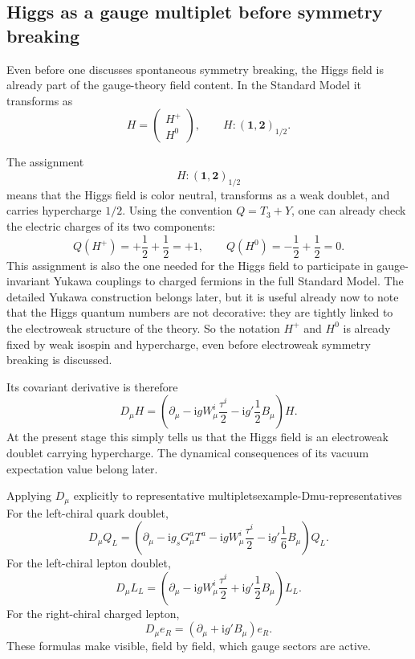 \documentclass[11pt,a4paper]{article}
\newcommand{\ii}{\mathrm{i}}
\newcommand{\p}{\partial}
\begin{document}
\subsection{Higgs as a gauge multiplet before symmetry breaking}

Even before one discusses spontaneous symmetry breaking, the Higgs field is already part of the gauge-theory field content. In the Standard Model it transforms as
\begin{equation}
H=\begin{pmatrix}H^+\\ H^0\end{pmatrix},
\qquad
H:(\mathbf{1},\mathbf{2})_{1/2}.
\label{eq:Higgs-representation-expanded}
\end{equation}

The assignment
\[
H:(\mathbf{1},\mathbf{2})_{1/2}
\]
means that the Higgs field is color neutral, transforms as a weak doublet, and carries hypercharge \(1/2\). Using the convention \(Q=T_3+Y\), one can already check the electric charges of its two components:
\begin{equation}
	Q(H^+) = +\frac12 + \frac12 = +1,
	\qquad
	Q(H^0) = -\frac12 + \frac12 = 0.
	\label{eq:Higgs-charge-check}
\end{equation}
This assignment is also the one needed for the Higgs field to participate in gauge-invariant Yukawa couplings to charged fermions in the full Standard Model. The detailed Yukawa construction belongs later, but it is useful already now to note that the Higgs quantum numbers are not decorative: they are tightly linked to the electroweak structure of the theory. 
So the notation \(H^+\) and \(H^0\) is already fixed by weak isospin and hypercharge, even before electroweak symmetry breaking is discussed.

Its covariant derivative is therefore
\begin{equation}
D_\mu H=
\left(
\p_\mu-\ii gW_\mu^i\frac{\tau^i}{2}-\ii g'\frac12 B_\mu
\right)H.
\label{eq:Dmu-Higgs-expanded}
\end{equation}
At the present stage this simply tells us that the Higgs field is an electroweak doublet carrying hypercharge. The dynamical consequences of its vacuum expectation value belong later.

\begin{examplebox}{Applying \texorpdfstring{$D_\mu$}{Dmu} explicitly to representative multiplets}{example-Dmu-representatives}
For the left-chiral quark doublet,
\[
D_\mu Q_L=
\left(
\p_\mu-\ii g_s G_\mu^aT^a-\ii gW_\mu^i\frac{\tau^i}{2}-\ii g'\frac16 B_\mu
\right)Q_L.
\]
For the left-chiral lepton doublet,
\[
D_\mu L_L=
\left(
\p_\mu-\ii gW_\mu^i\frac{\tau^i}{2}+\ii g'\frac12 B_\mu
\right)L_L.
\]
For the right-chiral charged lepton,
\[
D_\mu e_R=(\p_\mu+\ii g'B_\mu)e_R.
\]
These formulas make visible, field by field, which gauge sectors are active.
\end{examplebox}
\end{document}
